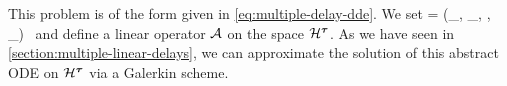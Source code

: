 \ee
This problem is of the form given in \cref{eq:multiple-delay-dde}. We set 
\be
    \boldtau = (_{}, _{}, \cdots, _{})\
\ee
and define a linear operator \(\mathcal A\) on the space \(\mathcal H^{\boldsymbol{\tau}}\). As we have seen in \cref{section:multiple-linear-delays}, we can approximate the solution of this abstract ODE on \(\mathcal H^{\boldsymbol{\tau}}\) via a Galerkin scheme.